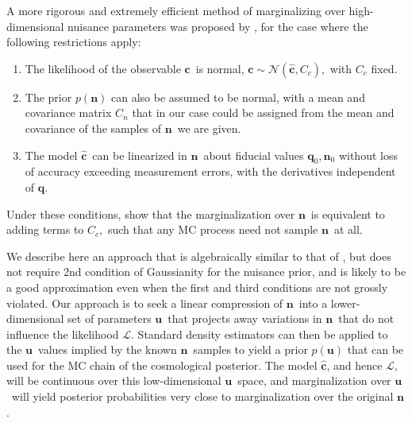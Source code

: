 \documentclass[linenumbers, onecolumn]{aastex63}
\newcommand{\vecc}{\ensuremath{\mathbf{c}}}
\newcommand{\vecq}{\ensuremath{\mathbf{q}}}
\newcommand{\vecn}{\ensuremath{\mathbf{n}}}
\newcommand{\vecu}{\ensuremath{\mathbf{u}}}
\newcommand{\hatc}{\ensuremath{\hat{\mathbf{c}}}}
\newcommand{\covm}{C}
\newcommand{\likeli}{\mathcal{L}}
\begin{document}
A more rigorous and extremely efficient method of marginalizing over high-dimensional nuisance parameters was proposed by \citet{hans}, for the case where the following restrictions apply:
\begin{enumerate}
\item The likelihood of the observable \vecc\ is normal, $\vecc \sim \mathcal{N}( \hatc, \covm_c),$ with $\covm_c$ fixed.
\item The prior $p(\vecn)$ can also be assumed to be normal, with a mean and covariance matrix $\covm_n$ that in our case could be assigned from the mean and covariance of the samples of \vecn\ we are given.
\item The model \hatc\ can be linearized in \vecn\ about fiducial values $\vecq_0, \vecn_0$ without loss of accuracy exceeding measurement errors, with the derivatives independent of \vecq.
\end{enumerate}
Under these conditions, \citet{hans} show that the marginalization over \vecn\ is equivalent to adding terms to $\covm_c,$ such that any MC process need not sample \vecn\ at all.

We describe here an approach that is algebraically similar to that of
\citet{hans}, but does not require 2nd condition of Gaussianity for
the nuisance prior, and is likely to be a good approximation even when
the first and third conditions are not grossly violated.  Our approach is to seek a linear compression of \vecn\ into a lower-dimensional set of parameters \vecu\ that projects away variations in \vecn\ that do not influence the likelihood $\likeli.$  Standard density estimators can then be applied to the \vecu\ values implied by the known \vecn\ samples to yield a prior $p(\vecu)$ that can be used for the MC chain of the cosmological posterior.  The model \hatc, and hence $\likeli,$ will be continuous over this low-dimensional \vecu\ space, and marginalization over \vecu\ will yield posterior probabilities very close to marginalization over the original \vecn.  
\end{document}
